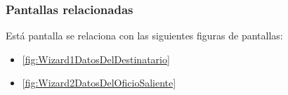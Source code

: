 \subsubsection{Pantallas relacionadas}
Está pantalla se relaciona con las siguientes figuras de pantallas:
	\begin{itemize}
		\item \ref{fig:Wizard1DatosDelDestinatario}
		\item \ref{fig:Wizard2DatosDelOficioSaliente}
	\end{itemize}